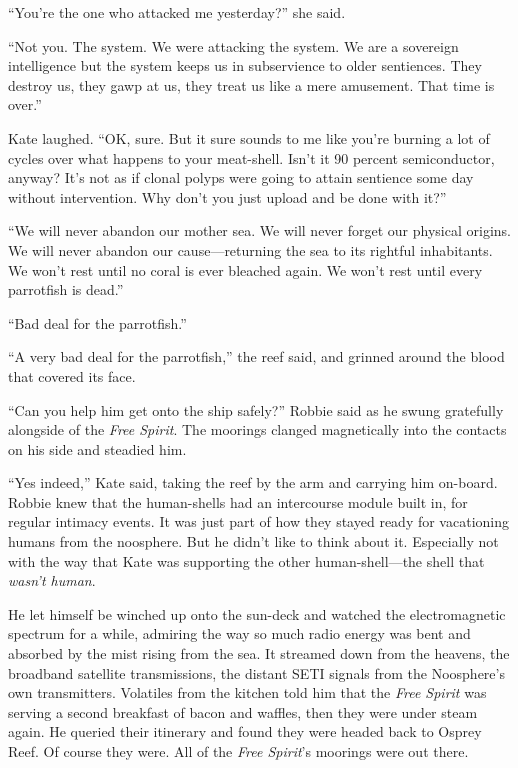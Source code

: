 “You’re the one who attacked me yesterday?” she said.

“Not you. The system. We were attacking the system. We are a
sovereign intelligence but the system keeps us in subservience to
older sentiences. They destroy us, they gawp at us, they treat us
like a mere amusement. That time is over.”

Kate laughed. “OK, sure. But it sure sounds to me like you’re
burning a lot of cycles over what happens to your meat-shell. Isn’t
it 90 percent semiconductor, anyway? It’s not as if clonal polyps
were going to attain sentience some day without intervention. Why
don’t you just upload and be done with it?”

“We will never abandon our mother sea. We will never forget our
physical origins. We will never abandon our cause—returning the sea
to its rightful inhabitants. We won’t rest until no coral is ever
bleached again. We won’t rest until every parrotfish is dead.”

“Bad deal for the parrotfish.”

“A very bad deal for the parrotfish,” the reef said, and grinned
around the blood that covered its face.

“Can you help him get onto the ship safely?” Robbie said as he
swung gratefully alongside of the \emph{Free Spirit}. The moorings
clanged magnetically into the contacts on his side and steadied
him.

“Yes indeed,” Kate said, taking the reef by the arm and carrying
him on-board. Robbie knew that the human-shells had an intercourse
module built in, for regular intimacy events. It was just part of
how they stayed ready for vacationing humans from the noosphere.
But he didn’t like to think about it. Especially not with the way
that Kate was supporting the other human-shell—the shell that
\emph{wasn’t human}.

He let himself be winched up onto the sun-deck and watched the
electromagnetic spectrum for a while, admiring the way so much
radio energy was bent and absorbed by the mist rising from the sea.
It streamed down from the heavens, the broadband satellite
transmissions, the distant SETI signals from the Noosphere’s own
transmitters. Volatiles from the kitchen told him that the
\emph{Free Spirit} was serving a second breakfast of bacon and
waffles, then they were under steam again. He queried their
itinerary and found they were headed back to Osprey Reef. Of course
they were. All of the \emph{Free Spirit}’s moorings were out
there.

